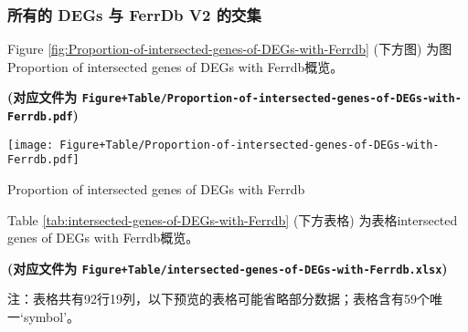 \documentclass[
]{article}
\begin{document}
\hypertarget{ux6240ux6709ux7684-degs-ux4e0e-ferrdb-v2-ux7684ux4ea4ux96c6}{%
\subsubsection{所有的 DEGs 与 FerrDb V2 的交集}\label{ux6240ux6709ux7684-degs-ux4e0e-ferrdb-v2-ux7684ux4ea4ux96c6}}

Figure \ref{fig:Proportion-of-intersected-genes-of-DEGs-with-Ferrdb} (下方图) 为图Proportion of intersected genes of DEGs with Ferrdb概览。

\textbf{(对应文件为 \texttt{Figure+Table/Proportion-of-intersected-genes-of-DEGs-with-Ferrdb.pdf})}

\def\@captype{figure}
\begin{center}
\texttt{[image: Figure+Table/Proportion-of-intersected-genes-of-DEGs-with-Ferrdb.pdf]}
\caption{Proportion of intersected genes of DEGs with Ferrdb}\label{fig:Proportion-of-intersected-genes-of-DEGs-with-Ferrdb}
\end{center}

Table \ref{tab:intersected-genes-of-DEGs-with-Ferrdb} (下方表格) 为表格intersected genes of DEGs with Ferrdb概览。

\textbf{(对应文件为 \texttt{Figure+Table/intersected-genes-of-DEGs-with-Ferrdb.xlsx})}

\begin{center}\begin{tcolorbox}[colback=gray!10, colframe=gray!50, width=0.9\linewidth, arc=1mm, boxrule=0.5pt]注：表格共有92行19列，以下预览的表格可能省略部分数据；表格含有59个唯一`symbol'。
\end{tcolorbox}
\end{center}
\end{document}
